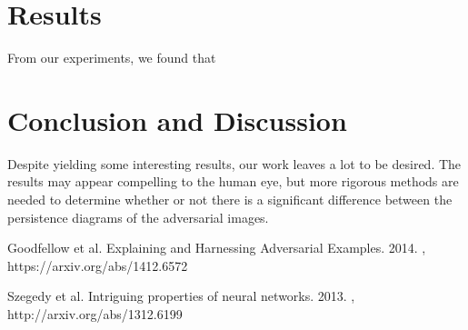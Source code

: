 \documentclass[twoside,twocolumn]{article}
\begin{document}
\section{Results}

From our experiments, we found that



\section{Conclusion and Discussion}

Despite yielding some interesting results, our work leaves a lot to be desired. The results may appear compelling to the human eye, but more rigorous methods are needed to determine whether or not there is a significant difference between the persistence diagrams of the adversarial images.




\begin{thebibliography}{99} %

Goodfellow et al.
\newblock Explaining and Harnessing Adversarial Examples. 2014.
, https://arxiv.org/abs/1412.6572

Szegedy et al.
\newblock Intriguing properties of neural networks. 2013.
, http://arxiv.org/abs/1312.6199
 

 
 
\end{thebibliography}

\end{document}
